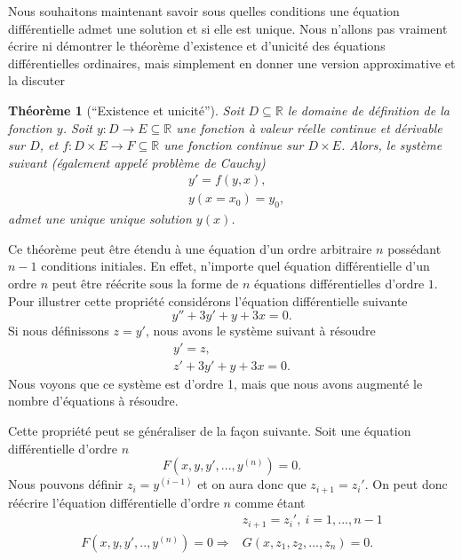 \documentclass[a4paper,12pt]{book}
\newcommand{\real}{\mathbb{R}}
\newtheorem{theoreme}{Théorème}
\begin{document}
Nous souhaitons maintenant savoir sous quelles conditions une équation différentielle admet une solution 
et si elle est unique. Nous n'allons pas vraiment écrire ni démontrer le théorème 
d'existence et d'unicité des équations différentielles ordinaires, mais simplement en donner une 
version approximative et la discuter
\begin{theoreme}[``Existence et unicité'']
 Soit $D\subseteq\real$ le domaine de définition de la fonction $y$. Soit  
 $y:D\rightarrow E\subseteq \real$ une fonction à valeur réelle continue et dérivable sur $D$, 
 et $f:D\times E\rightarrow F\subseteq\real$ une fonction continue sur $D\times E$. 
 Alors, le système suivant (également appelé problème de Cauchy)
 \begin{align}
  &y'=f(y,x),\\
  &y(x=x_0)=y_0,
 \end{align}
admet une unique unique solution $y(x)$.
\end{theoreme}
Ce théorème peut être étendu à une équation d'un ordre arbitraire $n$ possédant $n-1$
conditions initiales. En effet, n'importe quel équation différentielle d'un ordre $n$
peut être réécrite sous la forme de $n$ équations différentielles d'ordre $1$.
Pour illustrer cette propriété considérons l'équation différentielle suivante
\begin{equation}
 y''+3y'+y+3x=0.
\end{equation}
Si nous définissons $z=y'$, nous avons le système suivant à résoudre
\begin{align}
 y'=z,\\
 z'+3y'+y+3x=0.
\end{align}
Nous voyons que ce système est d'ordre 1, mais que nous avons augmenté le nombre d'équations à résoudre.

Cette propriété peut se généraliser de la façon suivante. 
Soit une équation différentielle d'ordre $n$
\begin{equation}
 F(x,y,y',...,y^{(n)})=0.
\end{equation}
Nous pouvons définir $z_i=y^{(i-1)}$ et on aura donc que $z_{i+1}=z_i'$. On peut donc 
réécrire l'équation différentielle d'ordre $n$ comme étant 
\begin{align}
 &z_{i+1}=z_i',\ i=1,...,n-1\\
 F(x,y,y',..,y^{(n)})=0 \Rightarrow &G(x,z_1,z_2,...,z_n)=0.
\end{align}
\end{document}
